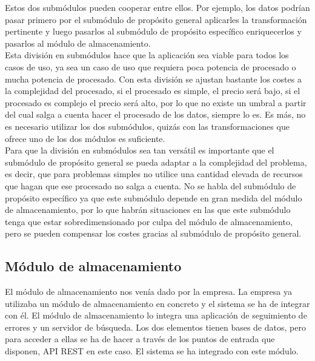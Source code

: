 Estos dos submódulos pueden cooperar entre ellos. Por ejemplo, los datos podrían pasar primero por el submódulo de propósito general aplicarles la transformación pertinente y luego pasarlos al submódulo de propósito específico enriquecerlos y pasarlos al módulo de almacenamiento.
\\
Esta división en submódulos hace que la aplicación sea viable para todos los casos de uso, ya sea un caso de uso que requiera poca potencia de procesado o mucha potencia de procesado. Con esta división se ajustan bastante los costes a la complejidad del procesado, si el procesado es simple, el precio será bajo, si el procesado es complejo el precio será alto, por lo que no existe un umbral a partir del cual salga a cuenta hacer el procesado de los datos, siempre lo es. Es más, no es necesario utilizar los dos submódulos, quizás con las transformaciones que ofrece uno de los dos módulos es suficiente. 
\\
Para que la división en submódulos sea tan versátil es importante que el submódulo de propósito general se pueda adaptar a la complejidad del problema, es decir, que para problemas simples no utilice una cantidad elevada de recursos que hagan que ese procesado no salga a cuenta. No se habla del submódulo de propósito específico ya que este submódulo depende en gran medida del módulo de almacenamiento, por lo que habrán situaciones en las que este submódulo tenga que estar sobredimensionado por culpa del módulo de almacenamiento, pero se pueden compensar los costes gracias al submódulo de propósito general.



\subsection{Módulo de almacenamiento}
El módulo de almacenamiento nos venía dado por la empresa. La empresa ya utilizaba un módulo de almacenamiento en concreto y el sistema se ha de integrar con él. El módulo de almacenamiento lo integra una aplicación de seguimiento de errores y un servidor de búsqueda. Los dos elementos tienen bases de datos, pero para acceder a ellas se ha de hacer a través de los puntos de entrada que disponen, API REST en este caso. El sistema se ha integrado con este módulo.

